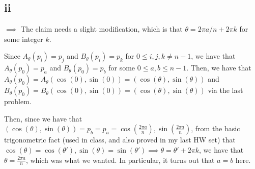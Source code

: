 \documentclass[12pt,letterpaper]{article}
\theoremstyle{definition}
\newcommand{\Z}{\mathbb{Z}}
\begin{document}
\subsection*{ii}

\(\implies\) The claim needs a slight modification, which is that \(\theta = 2\pi a / n + 2\pi k\) for some integer \(k\).

Since \(A_{\theta}(p_{i}) = p_{j}\) and \(B_{\theta}(p_{i}) = p_{k}\) for \(0 \leq i,j,k \neq n - 1\), we have that \(A_{\theta}(p_{0}) = p_{a}\) and \(B_{\theta}(p_{0}) = p_{b}\) for some \(0 \leq a,b \leq n - 1\). Then, we have that \(A_{\theta}(p_{0}) = A_{\theta}(\cos(0), \sin(0)) = (\cos(\theta), \sin(\theta))\) and \(B_{\theta}(p_{0}) = B_{\theta}(\cos(0),\sin(0)) = (\cos(\theta),\sin(\theta))\) via the last problem.

Then, since we have that \((\cos(\theta), \sin(\theta)) = p_{b} = p_{a} = \cos(\frac{2\pi a}{n}), \sin(\frac{2\pi a}{n})\), from the basic trigonometric fact (used in class, and also proved in my last HW set) that \(\cos(\theta) = \cos(\theta'), \sin(\theta) = \sin(\theta') \implies \theta = \theta' + 2\pi k\), we have that \(\theta = \frac{2\pi a}{n}\), which was what we wanted. In particular, it turns out that \(a = b\) here.



\end{document}

